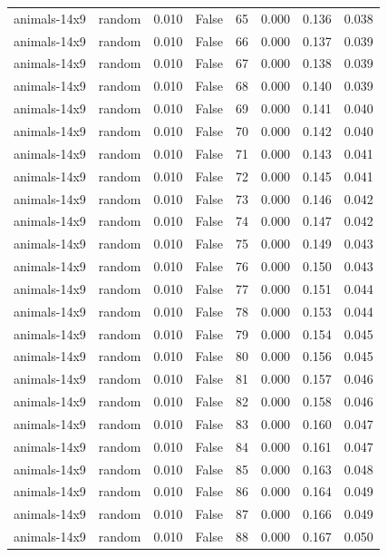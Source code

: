 \begin{tabular}{llrrrrrr}
animals-14x9 & random & 0.010 & False & 65 & 0.000 & 0.136 & 0.038 \\
animals-14x9 & random & 0.010 & False & 66 & 0.000 & 0.137 & 0.039 \\
animals-14x9 & random & 0.010 & False & 67 & 0.000 & 0.138 & 0.039 \\
animals-14x9 & random & 0.010 & False & 68 & 0.000 & 0.140 & 0.039 \\
animals-14x9 & random & 0.010 & False & 69 & 0.000 & 0.141 & 0.040 \\
animals-14x9 & random & 0.010 & False & 70 & 0.000 & 0.142 & 0.040 \\
animals-14x9 & random & 0.010 & False & 71 & 0.000 & 0.143 & 0.041 \\
animals-14x9 & random & 0.010 & False & 72 & 0.000 & 0.145 & 0.041 \\
animals-14x9 & random & 0.010 & False & 73 & 0.000 & 0.146 & 0.042 \\
animals-14x9 & random & 0.010 & False & 74 & 0.000 & 0.147 & 0.042 \\
animals-14x9 & random & 0.010 & False & 75 & 0.000 & 0.149 & 0.043 \\
animals-14x9 & random & 0.010 & False & 76 & 0.000 & 0.150 & 0.043 \\
animals-14x9 & random & 0.010 & False & 77 & 0.000 & 0.151 & 0.044 \\
animals-14x9 & random & 0.010 & False & 78 & 0.000 & 0.153 & 0.044 \\
animals-14x9 & random & 0.010 & False & 79 & 0.000 & 0.154 & 0.045 \\
animals-14x9 & random & 0.010 & False & 80 & 0.000 & 0.156 & 0.045 \\
animals-14x9 & random & 0.010 & False & 81 & 0.000 & 0.157 & 0.046 \\
animals-14x9 & random & 0.010 & False & 82 & 0.000 & 0.158 & 0.046 \\
animals-14x9 & random & 0.010 & False & 83 & 0.000 & 0.160 & 0.047 \\
animals-14x9 & random & 0.010 & False & 84 & 0.000 & 0.161 & 0.047 \\
animals-14x9 & random & 0.010 & False & 85 & 0.000 & 0.163 & 0.048 \\
animals-14x9 & random & 0.010 & False & 86 & 0.000 & 0.164 & 0.049 \\
animals-14x9 & random & 0.010 & False & 87 & 0.000 & 0.166 & 0.049 \\
animals-14x9 & random & 0.010 & False & 88 & 0.000 & 0.167 & 0.050 \\

\end{tabular}
